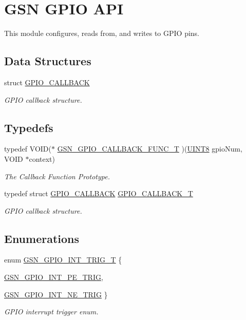 \hypertarget{a00648}{
\section{GSN GPIO API}
\label{a00648}
}


This module configures, reads from, and writes to GPIO pins.  


\subsection*{Data Structures}
\begin{DoxyCompactItemize}
\item 
struct \hyperlink{a00018}{GPIO\_\-CALLBACK}
\begin{DoxyCompactList}\small\item\em GPIO callback structure. \end{DoxyCompactList}\end{DoxyCompactItemize}
\subsection*{Typedefs}
\begin{DoxyCompactItemize}
\item 
typedef VOID($\ast$ \hyperlink{a00648_gae6698a8151cd85d7dac2358199ed7c6e}{GSN\_\-GPIO\_\-CALLBACK\_\-FUNC\_\-T} )(\hyperlink{a00660_gab27e9918b538ce9d8ca692479b375b6a}{UINT8} gpioNum, VOID $\ast$context)
\begin{DoxyCompactList}\small\item\em The Callback Function Prototype. \end{DoxyCompactList}\item 
typedef struct \hyperlink{a00018}{GPIO\_\-CALLBACK} \hyperlink{a00648_ga8646a0bb88c00e7b2463984ae3466ac7}{GPIO\_\-CALLBACK\_\-T}
\begin{DoxyCompactList}\small\item\em GPIO callback structure. \end{DoxyCompactList}\end{DoxyCompactItemize}
\subsection*{Enumerations}
\begin{DoxyCompactItemize}
\item 
enum \hyperlink{a00648_gaff716caaf31f66ce12b16f91bb47c06a}{GSN\_\-GPIO\_\-INT\_\-TRIG\_\-T} \{ \par
\hyperlink{a00648_ggaff716caaf31f66ce12b16f91bb47c06aa52a5bb11ea0fbbaeb8c0328e374c2170}{GSN\_\-GPIO\_\-INT\_\-PE\_\-TRIG}, 
\par
\hyperlink{a00648_ggaff716caaf31f66ce12b16f91bb47c06aa82a5e5bf12f8a3a17cd11b729b845b7c}{GSN\_\-GPIO\_\-INT\_\-NE\_\-TRIG}
 \}
\begin{DoxyCompactList}\small\item\em GPIO interrupt trigger enum. \end{DoxyCompactList}\end{DoxyCompactItemize}
